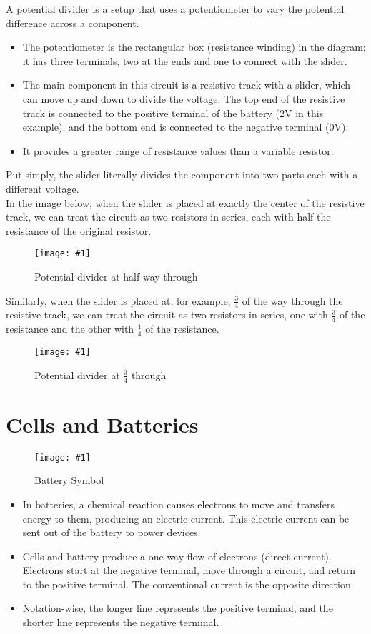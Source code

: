\documentclass[a4paper,12pt]{article}
\let\oldsection\section
\renewcommand\section{\clearpage\oldsection}
\newcommand{\lb}{\\[8pt]}
\newcommand{\img}[4]{\begin{center}
  \begin{figure}[H]
    \centering
    \texttt{[image: \#1]}
    \caption{#3}
    \label{fig:#4}
  \end{figure}
\end{center}}
\begin{document}
A potential divider is a setup that uses a potentiometer to vary the potential difference across a component.
\begin{itemize}
  \item The potentiometer is the rectangular box (resistance winding) in the diagram; it has three terminals, two at the ends and one to connect with the slider.
  \item The main component in this circuit is a resistive track with a slider, which can move up and down to divide the voltage. The top end of the resistive track is connected to the positive terminal of the battery (2V in this example), and the bottom end is connected to the negative terminal (0V).
  \item It provides a greater range of resistance values than a variable resistor.
\end{itemize}
\pagebreak
Put simply, the slider literally divides the component into two parts each with a different voltage. \lb
In the image below, when the slider is placed at exactly the center of the resistive track, we can treat the circuit as two resistors in series, each with half the resistance of the original resistor.
\img{divider1.png}{0.7}{Potential divider at half way through}{divider1}
Similarly, when the slider is placed at, for example, $\frac{3}{4}$ of the way through the resistive track, we can treat the circuit as two resistors in series, one with $\frac{3}{4}$ of the resistance and the other with $\frac{1}{4}$ of the resistance.
\img{divider2.png}{0.7}{Potential divider at $\frac{3}{4}$ through}{divider2}

\section{Cells and Batteries}

\img{battery_symbol.png}{0.45}{Battery Symbol}{batterysymbol}

\begin{itemize}
  \item In batteries, a chemical reaction causes electrons to move and transfers energy to them, producing an electric current. This electric current can be sent out of the battery to power devices.
  \item Cells and battery produce a one-way flow of electrons (direct current). Electrons start at the negative terminal, move through a circuit, and return to the positive terminal. The conventional current is the opposite direction.
  \item Notation-wise, the longer line represents the positive terminal, and the shorter line represents the negative terminal.
\end{itemize}
\end{document}
